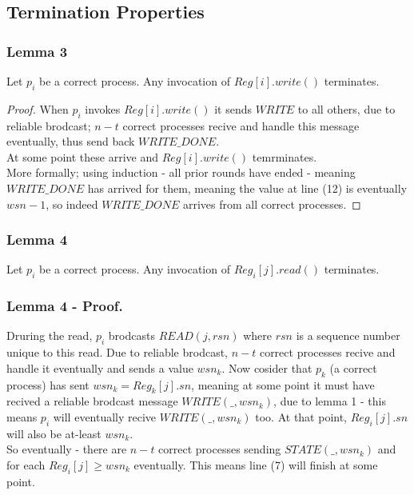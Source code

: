 \subsection{Termination Properties}
\begin{frame}
    \frametitle{Lemma 3}
    \begin{lemma}
        Let $p_i$ be a correct process. Any invocation of $Reg[i].write()$ terminates.
    \end{lemma}
    \begin{proof}
        When $p_i$ invokes $Reg[i].write()$ it sends $WRITE$ to all others,
        due to reliable brodcast; $n-t$ correct processes recive and handle this message
        eventually, thus send back $WRITE\_DONE$.\\
        At some point these arrive and $Reg[i].write()$ temrminates.\\
        More formally; using induction - all prior rounds have ended - meaning
        $WRITE\_DONE$ has arrived for them, meaning the value at line (12)
        is eventually $wsn-1$, so indeed $WRITE\_DONE$ arrives from all correct
        processes.
    \end{proof}
\end{frame}
\begin{frame}
    \frametitle{Lemma 4}
    \begin{lemma}
        Let $p_i$ be a correct process. Any invocation of $Reg_i[j].read()$ terminates.
    \end{lemma}
\end{frame}
\begin{frame}
    \frametitle{Lemma 4 - Proof.}
    Druring the read, $p_i$ brodcasts $READ(j,rsn)$ where $rsn$ is a sequence number 
    unique to this read. Due to reliable brodcast, $n-t$ correct processes recive and handle
    it eventually and sends a value $wsn_k$. Now cosider that $p_k$ (a correct process)
    has sent $wsn_k=Reg_k[j].sn$, meaning at some point it must have recived a
    reliable brodcast message $WRITE(\_,wsn_k)$, due to lemma 1 - this means $p_i$ will
    eventually recive $WRITE(\_,wsn_k)$ too. At that point, $Reg_i[j].sn$ will also
    be at-least $wsn_k$.\\
    So eventually - there are $n-t$ correct processes sending $STATE(\_, wsn_k)$
    and for each $Reg_i[j]\geq wsn_k$ eventually. This means line (7) will finish at some point.\\
\end{frame}
